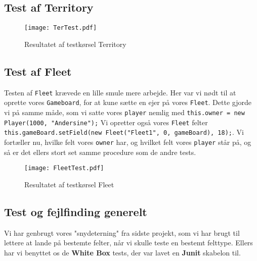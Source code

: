 \subsection{Test af Territory}

\begin{figure}[!ht]
\centering
\texttt{[image: TerTest.pdf]}
\caption[<Text for the list of figures>]{Resultatet af testkørsel Territory}
\label{fig:testtax} 
\end{figure}
\subsection{Test af Fleet}
Testen af \texttt{Fleet} krævede en lille smule mere arbejde. Her var vi nødt til at oprette vores \texttt{Gameboard}, for at kune sætte en ejer på vores \texttt{Fleet}. Dette gjorde vi på samme måde, som vi satte vores \texttt{player} nemlig med \texttt{this.owner = new Player(1000, "Andersine");} Vi opretter også vores \texttt{Fleet} felter \texttt{this.gameBoard.setField(new Fleet("Fleet1", 0, gameBoard), 18);}. Vi fortæller nu, hvilke felt vores \texttt{owner} har, og hvilket felt vores \texttt{player} står på, og så er det ellers stort set samme procedure som de andre tests.
\begin{figure}[!ht]
\centering
\texttt{[image: FleetTest.pdf]}
\caption[<Text for the list of figures>]{Resultatet af testkørsel Fleet}
\label{fig:testrefuge} 
\end{figure}
\subsection{Test og fejlfinding generelt}
Vi har genbrugt vores "snydeterning" fra sidste projekt, som vi har brugt til lettere at lande på bestemte felter, når vi skulle teste en bestemt felttype.
Ellers har vi benyttet os de \textbf{White Box} tests, der var lavet en \textbf{Junit} skabelon til.